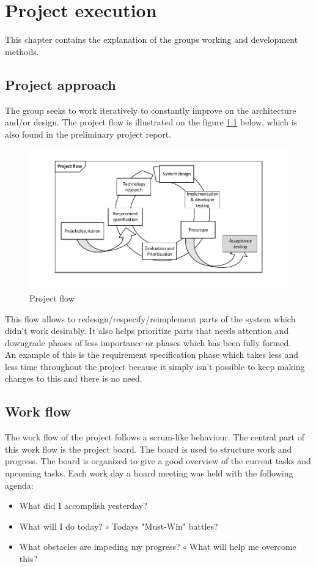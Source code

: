 \chapter{Project execution}
This chapter contains the explanation of the groups working and development methods.

\section{Project approach}
The group seeks to work iteratively to constantly improve on the architecture and/or design. The project flow is illustrated on the figure \ref{fig:projectflow} below, which is also found in the preliminary project report.
\begin{figure}[hbpt]
	\centering
	\includegraphics[width=1\textwidth]{billeder/9projectexecution/projectflow}
	\caption{Project flow}
	\label{fig:projectflow}
\end{figure}

This flow allows to redesign/respecify/reimplement parts of the system which didn't work desirably. It also helps prioritize parts that needs attention and downgrade phases of less importance or phases which has been fully formed.\\
An example of this is the requirement specification phase which takes less and less time throughout the project because it simply isn't possible to keep making changes to this and there is no need.\\

\section{Work flow}
The work flow of the project follows a scrum-like behaviour. The central part of this  work flow is the project board. The board is used to structure work and progress. The board is organized to give a good overview of the current tasks and upcoming tasks. Each work day a board meeting was held with the following agenda:
\begin{itemize}
	\item What did I accomplish yesterday?
	\item What will I do today?
	\subitem $\circ$ Todays "Must-Win" battles?
	\item What obstacles are impeding my progress?
	\subitem $\circ$ What will help me overcome this?
\end{itemize}

